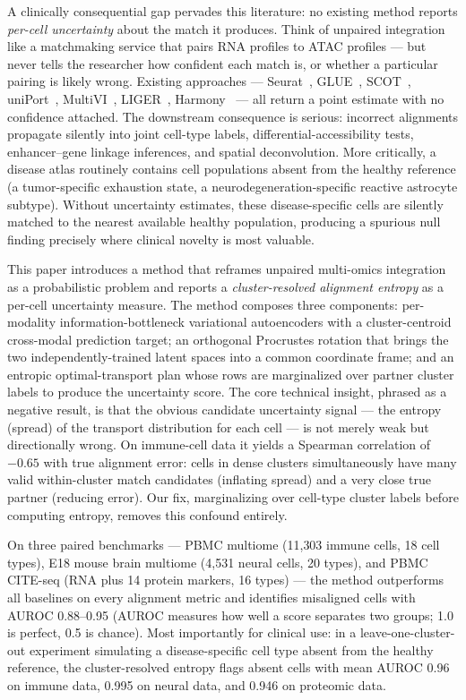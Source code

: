 \documentclass[pmlr]{jmlr}
\begin{document}
A clinically consequential gap pervades this literature: no existing method reports \emph{per-cell uncertainty} about the match it produces. Think of unpaired integration like a matchmaking service that pairs RNA profiles to ATAC profiles --- but never tells the researcher how confident each match is, or whether a particular pairing is likely wrong. Existing approaches --- Seurat~\citep{hao2024seurat5}, GLUE~\citep{cao2022multi}, SCOT~\citep{demetci2022scot}, uniPort~\citep{cao2022uniport}, MultiVI~\citep{ashuach2023multivi}, LIGER~\citep{welch2019liger}, Harmony~\citep{korsunsky2019harmony} --- all return a point estimate with no confidence attached. The downstream consequence is serious: incorrect alignments propagate silently into joint cell-type labels, differential-accessibility tests, enhancer--gene linkage inferences, and spatial deconvolution. More critically, a disease atlas routinely contains cell populations absent from the healthy reference (a tumor-specific exhaustion state, a neurodegeneration-specific reactive astrocyte subtype). Without uncertainty estimates, these disease-specific cells are silently matched to the nearest available healthy population, producing a spurious null finding precisely where clinical novelty is most valuable.

This paper introduces a method that reframes unpaired multi-omics integration as a probabilistic problem and reports a \emph{cluster-resolved alignment entropy} as a per-cell uncertainty measure. The method composes three components: per-modality information-bottleneck variational autoencoders with a cluster-centroid cross-modal prediction target; an orthogonal Procrustes rotation that brings the two independently-trained latent spaces into a common coordinate frame; and an entropic optimal-transport plan whose rows are marginalized over partner cluster labels to produce the uncertainty score. The core technical insight, phrased as a negative result, is that the obvious candidate uncertainty signal --- the entropy (spread) of the transport distribution for each cell --- is not merely weak but directionally wrong. On immune-cell data it yields a Spearman correlation of $-0.65$ with true alignment error: cells in dense clusters simultaneously have many valid within-cluster match candidates (inflating spread) and a very close true partner (reducing error). Our fix, marginalizing over cell-type cluster labels before computing entropy, removes this confound entirely.

On three paired benchmarks --- PBMC multiome (11{,}303 immune cells, 18 cell types), E18 mouse brain multiome (4{,}531 neural cells, 20 types), and PBMC CITE-seq (RNA plus 14 protein markers, 16 types) --- the method outperforms all baselines on every alignment metric and identifies misaligned cells with AUROC 0.88--0.95 (AUROC measures how well a score separates two groups; 1.0 is perfect, 0.5 is chance). Most importantly for clinical use: in a leave-one-cluster-out experiment simulating a disease-specific cell type absent from the healthy reference, the cluster-resolved entropy flags absent cells with mean AUROC 0.96 on immune data, 0.995 on neural data, and 0.946 on proteomic data.
\end{document}
